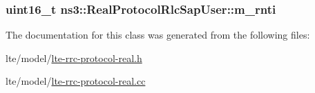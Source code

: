 \subsubsection[{\texorpdfstring{m\+\_\+rnti}{m_rnti}}]{\setlength{\rightskip}{0pt plus 5cm}uint16\+\_\+t ns3\+::\+Real\+Protocol\+Rlc\+Sap\+User\+::m\+\_\+rnti\hspace{0.3cm}{\ttfamily [private]}}\hypertarget{classns3_1_1RealProtocolRlcSapUser_a16544cd6ab3a77750bededc345624f95}{}\label{classns3_1_1RealProtocolRlcSapUser_a16544cd6ab3a77750bededc345624f95}


The documentation for this class was generated from the following files\+:\begin{DoxyCompactItemize}
\item 
lte/model/\hyperlink{lte-rrc-protocol-real_8h}{lte-\/rrc-\/protocol-\/real.\+h}\item 
lte/model/\hyperlink{lte-rrc-protocol-real_8cc}{lte-\/rrc-\/protocol-\/real.\+cc}\end{DoxyCompactItemize}
